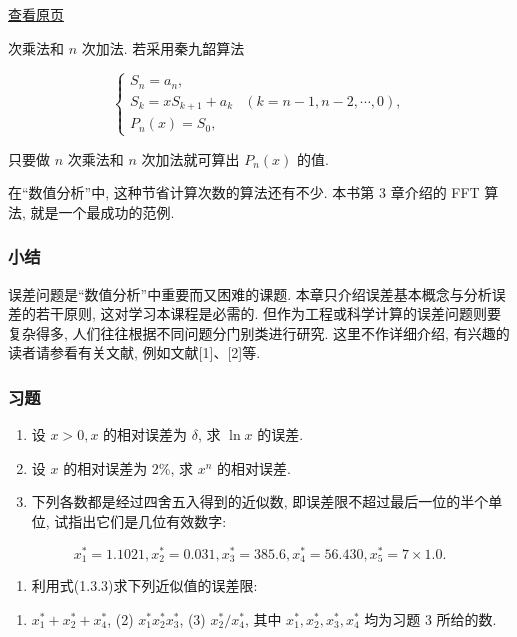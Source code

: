 \documentclass[
  10pt,
  a4paper,
]{article}
\providecommand{\tightlist}{%
  \setlength{\itemsep}{0pt}\setlength{\parskip}{0pt}}
\begin{document}
\href{../../../source-images/pdf-025.jpeg}{查看原页}

次乘法和 \(n\) 次加法. 若采用秦九韶算法

\[
\begin{cases} S_n = a_n, \\ S_k = xS_{k+1} + a_k & (k=n-1,n-2,\cdots,0), \\ P_n(x) = S_0, \end{cases} \tag{1.4.1}
\]

只要做 \(n\) 次乘法和 \(n\) 次加法就可算出 \(P_n(x)\) 的值.

在``数值分析''中, 这种节省计算次数的算法还有不少. 本书第 3 章介绍的 FFT
算法, 就是一个最成功的范例.

\subsubsection{小结}\label{ux5c0fux7ed3}

误差问题是``数值分析''中重要而又困难的课题.
本章只介绍误差基本概念与分析误差的若干原则, 这对学习本课程是必需的.
但作为工程或科学计算的误差问题则要复杂得多,
人们往往根据不同问题分门别类进行研究. 这里不作详细介绍,
有兴趣的读者请参看有关文献, 例如文献{[}1{]}、{[}2{]}等.

\subsubsection{习题}\label{ux4e60ux9898}

\begin{enumerate}
\def\labelenumi{\arabic{enumi}.}
\item
  设 \(x>0, x\) 的相对误差为 \(\delta\), 求 \(\ln x\) 的误差.
\item
  设 \(x\) 的相对误差为 \(2\%\), 求 \(x^n\) 的相对误差.
\item
  下列各数都是经过四舍五入得到的近似数,
  即误差限不超过最后一位的半个单位, 试指出它们是几位有效数字:
\end{enumerate}

\[
x_1^* = 1.1021, x_2^* = 0.031, x_3^* = 385.6, x_4^* = 56.430, x_5^* = 7 \times 1.0.
\]

\begin{enumerate}
\def\labelenumi{\arabic{enumi}.}
\setcounter{enumi}{3}
\tightlist
\item
  利用式(1.3.3)求下列近似值的误差限:
\end{enumerate}

\begin{enumerate}
\def\labelenumi{(\arabic{enumi})}
\tightlist
\item
  \(x_1^* + x_2^* + x_4^*\), (2) \(x_1^* x_2^* x_3^*\), (3)
  \(x_2^* / x_4^*\), 其中 \(x_1^*, x_2^*, x_3^*, x_4^*\) 均为习题 3
  所给的数.
\end{enumerate}
\end{document}
